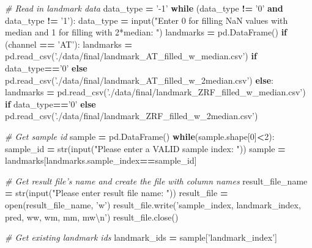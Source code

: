 \documentclass[10pt,letterpaper]{article}
\newenvironment{Shaded}{\begin{snugshade}}{\end{snugshade}}
\newcommand{\KeywordTok}[1]{\textcolor[rgb]{0.13,0.29,0.53}{\textbf{#1}}}
\newcommand{\DecValTok}[1]{\textcolor[rgb]{0.00,0.00,0.81}{#1}}
\newcommand{\CharTok}[1]{\textcolor[rgb]{0.31,0.60,0.02}{#1}}
\newcommand{\StringTok}[1]{\textcolor[rgb]{0.31,0.60,0.02}{#1}}
\newcommand{\CommentTok}[1]{\textcolor[rgb]{0.56,0.35,0.01}{\textit{#1}}}
\newcommand{\ControlFlowTok}[1]{\textcolor[rgb]{0.13,0.29,0.53}{\textbf{#1}}}
\newcommand{\OperatorTok}[1]{\textcolor[rgb]{0.81,0.36,0.00}{\textbf{#1}}}
\newcommand{\BuiltInTok}[1]{#1}
\newcommand{\NormalTok}[1]{#1}
\begin{document}
\begin{Shaded}
\begin{Highlighting}[]
    \CommentTok{# Read in landmark data}
\NormalTok{    data_type }\OperatorTok{=} \StringTok{'-1'}
    \ControlFlowTok{while}\NormalTok{ (data_type }\OperatorTok{!=} \StringTok{'0'} \KeywordTok{and}\NormalTok{ data_type }\OperatorTok{!=} \StringTok{'1'}\NormalTok{):}
\NormalTok{        data_type }\OperatorTok{=} \BuiltInTok{input}\NormalTok{(}\StringTok{"Enter 0 for filling NaN values with median and 1 for filling with 2*median: "}\NormalTok{)}
\NormalTok{    landmarks }\OperatorTok{=}\NormalTok{ pd.DataFrame()}
    \ControlFlowTok{if}\NormalTok{ (channel }\OperatorTok{==} \StringTok{'AT'}\NormalTok{):}
\NormalTok{        landmarks }\OperatorTok{=}\NormalTok{ pd.read_csv(}\StringTok{'./data/final/landmark_AT_filled_w_median.csv'}\NormalTok{) }\ControlFlowTok{if}\NormalTok{ data_type}\OperatorTok{==}\StringTok{'0'} \ControlFlowTok{else}\NormalTok{ pd.read_csv(}\StringTok{'./data/final/landmark_AT_filled_w_2median.csv'}\NormalTok{)}
    \ControlFlowTok{else}\NormalTok{:}
\NormalTok{        landmarks }\OperatorTok{=}\NormalTok{ pd.read_csv(}\StringTok{'./data/final/landmark_ZRF_filled_w_median.csv'}\NormalTok{) }\ControlFlowTok{if}\NormalTok{ data_type}\OperatorTok{==}\StringTok{'0'} \ControlFlowTok{else}\NormalTok{ pd.read_csv(}\StringTok{'./data/final/landmark_ZRF_filled_w_2median.csv'}\NormalTok{)}

    \CommentTok{# Get sample id}
\NormalTok{    sample }\OperatorTok{=}\NormalTok{ pd.DataFrame()}
    \ControlFlowTok{while}\NormalTok{(sample.shape[}\DecValTok{0}\NormalTok{]}\OperatorTok{<}\DecValTok{2}\NormalTok{):}
\NormalTok{        sample_id }\OperatorTok{=} \BuiltInTok{str}\NormalTok{(}\BuiltInTok{input}\NormalTok{(}\StringTok{"Please enter a VALID sample index: "}\NormalTok{))}
\NormalTok{        sample }\OperatorTok{=}\NormalTok{ landmarks[landmarks.sample_index}\OperatorTok{==}\NormalTok{sample_id]}

    \CommentTok{# Get result file's name and create the file with column names}
\NormalTok{    result_file_name }\OperatorTok{=} \BuiltInTok{str}\NormalTok{(}\BuiltInTok{input}\NormalTok{(}\StringTok{"Please enter result file name: "}\NormalTok{))}
\NormalTok{    result_file }\OperatorTok{=} \BuiltInTok{open}\NormalTok{(result_file_name, }\StringTok{'w'}\NormalTok{)}
\NormalTok{    result_file.write(}\StringTok{'sample_index, landmark_index, pred, ww, wm, mm, mw}\CharTok{\textbackslash{}n}\StringTok{'}\NormalTok{)}
\NormalTok{    result_file.close()}

    \CommentTok{# Get existing landmark ids}
\NormalTok{    landmark_ids }\OperatorTok{=}\NormalTok{ sample[}\StringTok{'landmark_index'}\NormalTok{]}


\end{Highlighting}
\end{Shaded}
\end{document}
